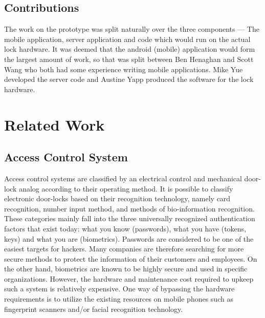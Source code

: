\documentclass[conference]{IEEEtran}
\begin{document}
\subsection{Contributions}
The work on the prototype was split naturally over the three components --- The mobile application, server application and code which would run on the actual lock hardware.
It was deemed that the android (mobile) application would form the largest amount of work, so that was split between Ben Henaghan and Scott Wang who both had some experience writing mobile applications.
Mike Yue developed the server code and Austine Yapp produced the software for the lock hardware.

\section{Related Work}
\subsection{Access Control System}
	Access control systems are classified by an electrical control and mechanical door-lock analog according to their operating method. It is possible to classify electronic door-locks based on their recognition technology, namely card recognition, number input method, and methods of bio-information recognition. These categories mainly fall into the three universally recognized authentication factors that exist today: what you know (passwords), what you have (tokens, keys) and what you are (biometrics). 
Passwords are considered to be one of the easiest targets for hackers. Many companies are therefore searching for more secure methods to protect the information of their customers and employees. On the other hand, biometrics are known to be highly secure and used in specific organizations. However, the hardware and maintenance cost required to upkeep such a system is relatively expensive. One way of bypassing the hardware requirements is to utilize the existing resources on mobile phones such as fingerprint scanners and/or facial recognition technology.
\end{document}
